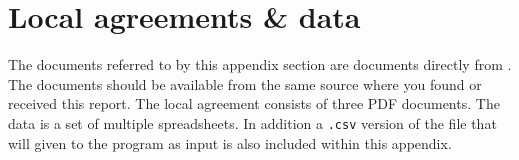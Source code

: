 \chapter{Local agreements \& data}\label{appendix:local-agreements}
The documents referred to by this appendix section are documents directly from \siemens. The documents should be available from the same source where you found or received this report. The local agreement consists of three PDF documents. The data is a set of multiple spreadsheets. In addition a \verb|.csv| version of the file that will given to the program as input is also included within this appendix.

